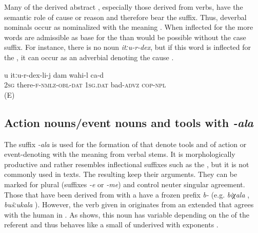 Many of the derived abstract , especially those derived from verbs, have the semantic role of cause or reason and therefore bear the  suffix. Thus, deverbal nominals occur as nominalized  with the meaning . When inflected for the  more words are admissible as base for the  than would be possible without the case suffix. For instance, there is no noun \textit{itːu-r-dex}, but if this word is inflected for the , it can occur as an adverbial denoting the cause .
%
\begin{exe}
	\ex	\label{Because you are there I feel bad}
	\gll	u itːu-r-dex-li-j dam wahi-l ca-d \\
		2\textsc{sg}	there-\textsc{f-nmlz-obl}-\textsc{dat}	1\textsc{sg}.\textsc{dat}	bad-\textsc{advz} \textsc{cop-npl}\\
	\glt	{} (E)
\end{exe}



\subsection{Action nouns\slash event nouns and tools with \textit{-ala}}
\label{ssec:Action and event nouns way of V-ing with -ala}

The suffix \textit{-ala} is used for the formation of  that denote tools and of action or event-denoting  with the meaning  from verbal stems. It is morphologically productive and rather resembles inflectional suffixes such as the , but it is not commonly used in texts. The resulting  keep their arguments. They can be marked for plural (suffixes \textit{-e} or \textit{-me}) and control neuter singular agreement. Those  that have been derived from  with a   have a frozen  prefix \textit{b-} (e.g. \textit{biχala} , \textit{bušːukala} ). However, the verb given in  originates from an extended  that agrees with the human  in . As  shows, this noun has variable  depending on the  of the referent and thus behaves like a small  of underived   with  exponents .
%



